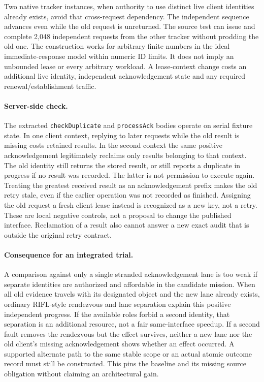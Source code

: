 \documentclass{article}
\begin{document}
Two native tracker instances, when authority to use distinct live
client identities already exists, avoid that cross-request dependency.
The independent sequence advances even while the old request is
unreturned. The source test can issue and complete 2,048 independent
requests from the other tracker without prodding the old one. The
construction works for arbitrary finite numbers in the ideal
immediate-response model within numeric ID limits. It does not imply
an unbounded lease or every arbitrary workload. A lease-context
change costs an additional live identity, independent acknowledgement
state and any required renewal/establishment traffic.

\paragraph{Server-side check.}
The extracted \texttt{checkDuplicate} and \texttt{processAck} bodies
operate on serial fixture state. In one client context, replying to
later requests while the old result is missing costs retained results.
In the second context the same positive acknowledgement legitimately
reclaims only results belonging to that context. The old identity
still returns the stored result, or still reports a duplicate in
progress if no result was recorded. The latter is not permission to
execute again. Treating the greatest received result as an
acknowledgement prefix makes the old retry stale, even if the earlier
operation was not recorded as finished. Assigning the old request a
fresh client lease instead is recognized as a new key, not a retry.
These are local negative controls, not a proposal to change the
published interface. Reclamation of a result also cannot answer a
new exact audit that is outside the original retry contract.

\paragraph{Consequence for an integrated trial.}
A comparison against only a single stranded acknowledgement lane is
too weak if separate identities are authorized and affordable in the
candidate mission. When all old evidence travels with its designated
object and the new lane already exists, ordinary RIFL-style rendezvous
and lane separation explain this positive independent progress. If the
available roles forbid a second identity, that separation is an
additional resource, not a fair same-interface speedup. If a second
fault removes the rendezvous but the effect survives, neither a new
lane nor the old client's missing acknowledgement shows whether an
effect occurred. A supported alternate path to the same stable scope
or an actual atomic outcome record must still be constructed.
This pins the baseline and its missing source obligation without
claiming an architectural gain.
\end{document}
